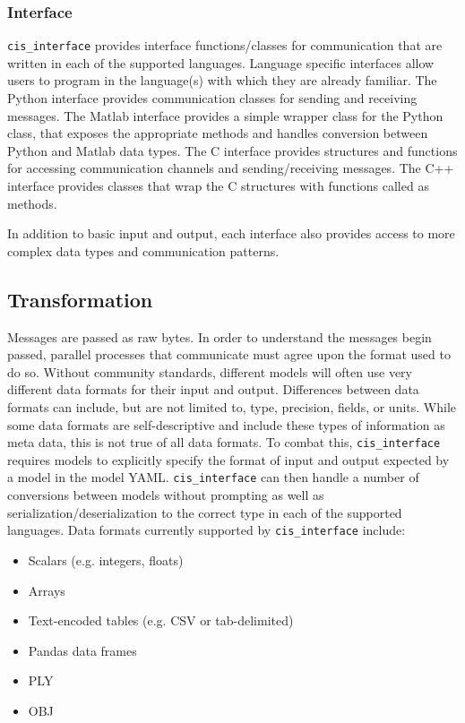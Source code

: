 \documentclass[journal]{IEEEtran}
\newcommand{\cis}{{\tt cis\_interface}{}}
\begin{document}
\subsubsection{Interface}\label{SSS:interface}
%
{\cis} provides interface functions/classes for communication that are 
written in each of the supported languages. Language specific interfaces 
allow users to program in the 
language(s) with which they are already familiar. The Python interface provides 
communication classes for sending and receiving messages. The Matlab 
interface provides a simple wrapper class for the Python class, that exposes 
the appropriate methods and handles conversion between Python and Matlab 
data types. The C interface provides structures and functions for accessing 
communication channels and sending/receiving messages. The C++ interface 
provides classes that wrap the C structures with functions called as methods.

In addition to basic input and output, each interface also provides access 
to more complex data types and communication patterns.


%
\subsection{Transformation}\label{SS:transformation}
%
%
Messages are passed as raw bytes. In order to understand the messages begin passed, parallel processes that communicate must agree upon the format used to do so. Without community standards, different models will often use very different data formats for their input and output. Differences between data formats can include, but are not limited to, type, precision, fields, or units. While some data formats are self-descriptive and include these types of information as meta data, this is not true of all data formats. To combat this, {\cis} requires models to explicitly specify the format of input and output expected by a model in the model YAML. {\cis} can then handle a number of conversions between models without prompting as well as serialization/deserialization to the correct type in each of the supported languages. Data formats currently supported by {\cis} include:
%
\begin{itemize}
	\item Scalars (e.g. integers, floats)
	\item Arrays
	\item Text-encoded tables (e.g. CSV or tab-delimited)
	\item Pandas data frames
	\item PLY
	\item OBJ
\end{itemize}
\end{document}
